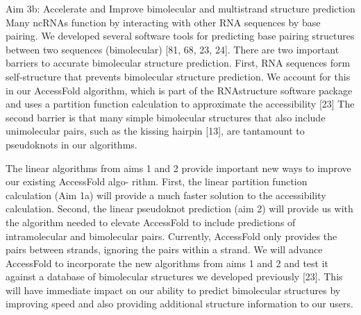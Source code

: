 Aim 3b: Accelerate and Improve bimolecular and multistrand structure prediction
Many ncRNAs function by interacting with other RNA sequences by base pairing. We developed several software tools for predicting base pairing structures between two sequences (bimolecular) [81, 68, 23, 24]. There are two important barriers to accurate bimolecular structure prediction. First, RNA sequences form self-structure that prevents bimolecular structure prediction. We account for this in our AccessFold algorithm, which is part of the RNAstructure software package and uses a partition function calculation to approximate the accessibility [23] The second barrier is that many simple bimolecular structures that also include unimolecular pairs, such as the kissing hairpin [13], are tantamount to pseudoknots in our algorithms.

The linear algorithms from aims 1 and 2 provide important new ways to improve our existing AccessFold algo- rithm. First, the linear partition function calculation (Aim 1a) will provide a much faster solution to the accessibility calculation. Second, the linear pseudoknot prediction (aim 2) will provide us with the algorithm needed to elevate AccessFold to include predictions of intramolecular and bimolecular pairs. Currently, AccessFold only provides the pairs between strands, ignoring the pairs within a strand.
We will advance AccessFold to incorporate the new algorithms from aims 1 and 2 and test it against a database of bimolecular structures we developed previously [23]. This will have immediate impact on our ability to predict bimolecular structures by improving speed and also providing additional structure information to our users.
